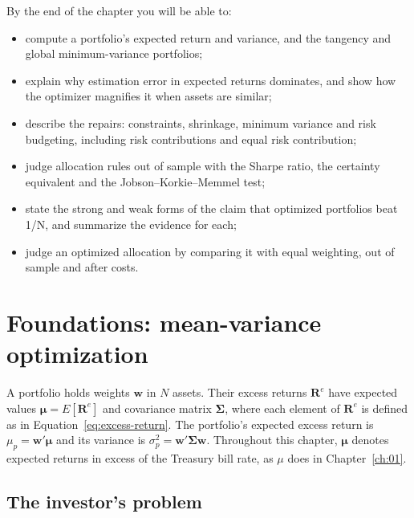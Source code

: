 By the end of the chapter you will be able to:

\begin{itemize}
  \item compute a portfolio's expected return and variance, and the tangency and global minimum-variance portfolios;
  \item explain why estimation error in expected returns dominates, and show how the optimizer magnifies it when assets are similar;
  \item describe the repairs: constraints, shrinkage, minimum variance and risk budgeting, including risk contributions and equal risk contribution;
  \item judge allocation rules out of sample with the Sharpe ratio, the certainty equivalent and the Jobson--Korkie--Memmel test;
  \item state the strong and weak forms of the claim that optimized portfolios beat 1/N, and summarize the evidence for each;
  \item judge an optimized allocation by comparing it with equal weighting, out of sample and after costs.
\end{itemize}

\section{Foundations: mean-variance optimization}
\label{sec:12-foundations}

A portfolio holds weights $\mathbf{w}$ in $N$ assets. Their excess returns $\mathbf{R}^{e}$ have expected values $\boldsymbol{\mu} = E[\mathbf{R}^{e}]$ and covariance matrix $\boldsymbol{\Sigma}$, where each element of $\mathbf{R}^{e}$ is defined as in Equation~\eqref{eq:excess-return}. The portfolio's expected excess return is $\mu_p = \mathbf{w}'\boldsymbol{\mu}$ and its variance is $\sigma_p^2 = \mathbf{w}'\boldsymbol{\Sigma}\mathbf{w}$. Throughout this chapter, $\boldsymbol{\mu}$ denotes expected returns in excess of the Treasury bill rate, as $\mu$ does in Chapter~\ref{ch:01}.

\subsection{The investor's problem}
\label{sec:12-problem}

